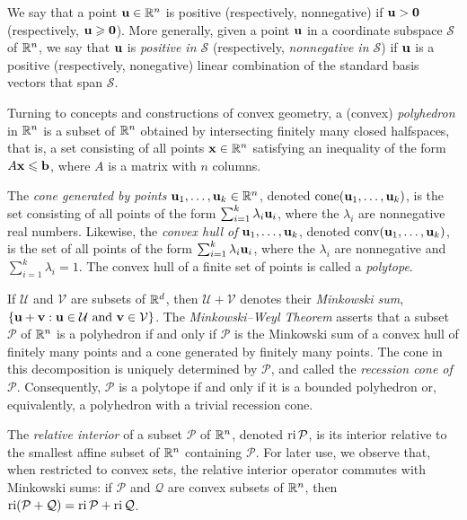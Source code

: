 \documentclass[11pt]{amsart}
\begin{document}
We say that a point $\mathbf{u}\in \mathbb{R}^n$ is positive (respectively, nonnegative) if $\mathbf{u} > \mathbf{0}$ (respectively, $\mathbf{u}\geqslant \mathbf{0}$).
More generally, given a point $\mathbf{u}$ in a coordinate subspace $\mathcal{S}$ of $\mathbb{R}^n$, we say that $\mathbf{u}$ is \emph{positive in $\mathcal{S}$} (respectively, \emph{nonnegative in $\mathcal{S}$}) if $\mathbf{u}$ is a positive (respectively, nonegative) linear combination of the standard basis vectors that span $\mathcal{S}$.

Turning to concepts and constructions of convex geometry, a (convex) \emph{polyhedron} in $\mathbb{R}^n$ is a subset of $\mathbb{R}^n$ obtained by intersecting finitely many closed halfspaces, that is, a set consisting of all points $\mathbf{x}\in \mathbb{R}^n$ satisfying an inequality of the form $A\mathbf{x}\leqslant \mathbf{b}$, where $A$ is a matrix with $n$ columns.

The \emph{cone generated by points $\mathbf{u}_1,\ldots,\mathbf{u}_k \in \mathbb{R}^n$}, denoted $\operatorname{cone}(\mathbf{u}_1,\ldots,\mathbf{u}_k)$, is the set consisting of all points of the form $\sum_{i=1}^k \lambda_i \mathbf{u}_i$, where the $\lambda_i$ are nonnegative real numbers.
Likewise, the \emph{convex hull of $\mathbf{u}_1,\ldots,\mathbf{u}_k$}, denoted $\operatorname{conv}(\mathbf{u}_1,\ldots,\mathbf{u}_k)$, is the set of all points of the form $\sum_{i=1}^k \lambda_i \mathbf{u}_i$, where the $\lambda_i$ are nonnegative and $\sum_{i=1}^k \lambda_i = 1$.
The convex hull of a finite set of points is called a \emph{polytope}.

If $\mathcal{U}$ and $\mathcal{V}$ are subsets of $\mathbb{R}^d$, then $\mathcal{U}+\mathcal{V}$ denotes their \emph{Minkowski sum}, $\{\mathbf{u}+\mathbf{v}: \mathbf{u}\in \mathcal{U}\text{ and }\mathbf{v}\in \mathcal{V}\}$.
The \emph{Minkowski--Weyl Theorem} asserts that a subset $\mathcal{P}$ of $\mathbb{R}^n$ is a polyhedron if and only if $\mathcal{P}$ is the Minkowski sum of a convex hull of finitely many points and a cone generated by finitely many points.
The cone in this decomposition is uniquely determined by $\mathcal{P}$, and called the \emph{recession cone of $\mathcal{P}$}.
Consequently, $\mathcal{P}$ is a polytope if and only if it is a bounded polyhedron or, equivalently, a polyhedron with a trivial recession cone. 

The \emph{relative interior} of a subset $\mathcal{P}$ of $\mathbb{R}^n$, denoted $\operatorname{ri} \mathcal{P}$, is its interior relative to the smallest affine subset of $\mathbb{R}^n$ containing $\mathcal{P}$.
For later use, we observe that, when restricted to convex sets, the relative interior operator commutes with Minkowski sums: if $\mathcal{P}$ and $\mathcal{Q}$ are convex subsets of $\mathbb{R}^n$, then $\operatorname{ri}(\mathcal{P}+\mathcal{Q})=\operatorname{ri} \mathcal{P}+\operatorname{ri} \mathcal{Q}$.
\end{document}
